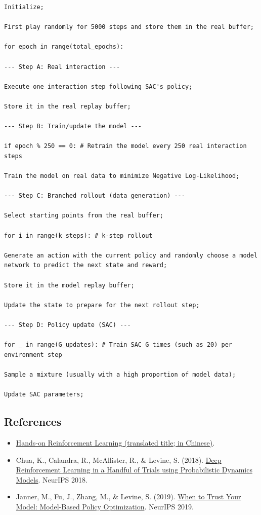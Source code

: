 \begin{verbatim}
Initialize;

First play randomly for 5000 steps and store them in the real buffer;

for epoch in range(total_epochs):

--- Step A: Real interaction ---

Execute one interaction step following SAC's policy;

Store it in the real replay buffer;

--- Step B: Train/update the model ---

if epoch % 250 == 0: # Retrain the model every 250 real interaction steps

Train the model on real data to minimize Negative Log-Likelihood;

--- Step C: Branched rollout (data generation) ---

Select starting points from the real buffer;

for i in range(k_steps): # k-step rollout

Generate an action with the current policy and randomly choose a model network to predict the next state and reward;

Store it in the model replay buffer;

Update the state to prepare for the next rollout step;

--- Step D: Policy update (SAC) ---

for _ in range(G_updates): # Train SAC G times (such as 20) per environment step

Sample a mixture (usually with a high proportion of model data);

Update SAC parameters;
\end{verbatim}

\FloatBarrier
{}
\hypertarget{references-63}{%
\subsection{References}\label{references-63}}

\vspace{0.25em}
\begin{itemize}
\tightlist
\item
  \href{https://hrl.boyuai.com/}{Hands-on Reinforcement Learning (translated title; in Chinese)}.
\item
  Chua, K., Calandra, R., McAllister, R., \& Levine, S. (2018). \href{https://arxiv.org/abs/1805.12114}{Deep Reinforcement Learning in a Handful of Trials using Probabilistic Dynamics Models}. NeurIPS 2018.
\item
  Janner, M., Fu, J., Zhang, M., \& Levine, S. (2019). \href{https://arxiv.org/abs/1906.08253}{When to Trust Your Model: Model-Based Policy Optimization}. NeurIPS 2019.
\end{itemize}

\clearpage
